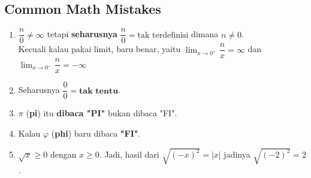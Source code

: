 	\subsection{Common Math Mistakes}
	\begin{enumerate}
	    \item $\dfrac{n}{0} \neq \infty$ tetapi \textbf{seharusnya} $\dfrac{n}{0} = \text{tak terdefinisi}$ dimana $n \neq 0$.\\
	    Kecuali kalau pakai limit, baru benar, yaitu $\lim_{x \rightarrow 0^+} \dfrac{n}{x} = \infty$ dan $\lim_{x \rightarrow 0^-} \dfrac{n}{x} = -\infty$
	    \item Seharusnya $\dfrac{0}{0} = \textbf{tak tentu}$.
	    \item $\pi$ (\textbf{pi}) itu \textbf{dibaca "PI"} bukan dibaca "FI". 
	    \item Kalau $\varphi$ (\textbf{phi}) baru dibaca \textbf{"FI"}.
	    \item $\sqrt{x} \ge 0$ dengan $x \ge 0$. Jadi, hasil dari $\sqrt{(-x)^2}=|x|$ jadinya $\sqrt{(-2)^2}=2$.
	\end{enumerate}

 
